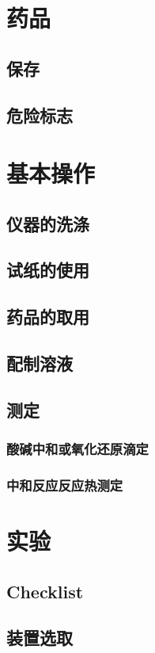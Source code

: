 \documentclass[a4paper]{article}
\begin{document}
	\clearpage
	\section{药品}
	\subsection{保存}
	\subsection{危险标志}
	
	\clearpage
	\section{基本操作}
	\subsection{仪器的洗涤}
	\subsection{试纸的使用}
	\subsection{药品的取用}
	\subsection{配制溶液}
	\subsection{测定}
	\subsubsection{酸碱中和或氧化还原滴定}
	\subsubsection{中和反应反应热测定}
	
	\clearpage
	\section{实验}
	\subsection{Checklist}
	\subsection{装置选取}
\end{document}
